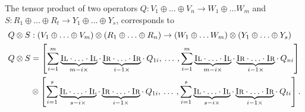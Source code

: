  
The tensor product of two operators $Q: V_1 \oplus \ldots \oplus V_n \rightarrow W_1  \oplus \ldots W_m $ and $S: R_1 \oplus \ldots \oplus R_t \rightarrow Y_1 \oplus \ldots \oplus Y_s$, corresponds to 
\begin{equation}
  \begin{split}
    Q \otimes S &:  (V_1 \oplus \ldots \oplus V_m) \otimes  (R_1 \oplus \ldots \oplus R_n)  \rightarrow  (W_1  \oplus \ldots W_m) \otimes  (Y_1 \oplus \ldots \oplus Y_s)\\
     Q \otimes S &= \left[ \sum_{i=1}^{m} \underbrace{\textsc{Il} \cdot \ldots \cdot \textsc{Il}}_{m-i \times } \cdot  \underbrace{\textsc{Ir} \cdot \ldots \cdot \textsc{Ir}}_{i-1 \times } \cdot  \hspace{2pt} Q_{1i},  \hspace{2pt} \ldots  \hspace{2pt}, \sum_{i=1}^{m} \underbrace{\textsc{Il} \cdot \ldots \cdot \textsc{Il}}_{m-i \times } \cdot  \underbrace{\textsc{Ir} \cdot \ldots \cdot \textsc{Ir}}_{i-1 \times } \cdot  \hspace{2pt} Q_{ni}  \right]  \\ 
    &  \otimes \left[ \sum_{i=1}^{s} \underbrace{\textsc{Il} \cdot \ldots \cdot \textsc{Il}}_{s-i \times } \cdot  \underbrace{\textsc{Ir} \cdot \ldots \cdot \textsc{Ir}}_{i-1 \times } \cdot  \hspace{2pt} Q_{1i},  \hspace{2pt} \ldots  \hspace{2pt}, \sum_{i=1}^{s} \underbrace{\textsc{Il} \cdot \ldots \cdot \textsc{Il}}_{s-i \times } \cdot  \underbrace{\textsc{Ir} \cdot \ldots \cdot \textsc{Ir}}_{i-1 \times } \cdot  \hspace{2pt} Q_{ti}  \right]. \\
  \end{split}
\end{equation}

